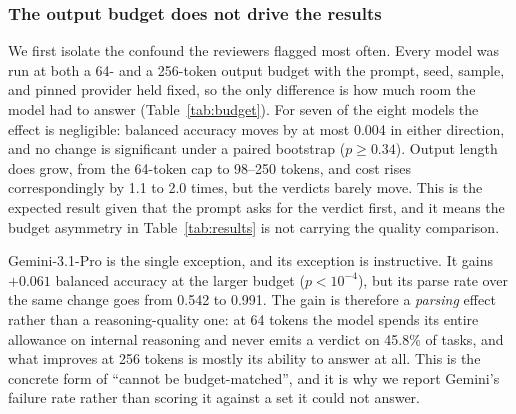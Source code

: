 \documentclass[computers,article,submit,moreauthors]{Definitions/mdpi}
\begin{document}
\subsubsection*{The output budget does not drive the results}
We first isolate the confound the reviewers flagged most often. Every model was run at both a 64- and a 256-token output budget with the prompt, seed, sample, and pinned provider held fixed, so the only difference is how much room the model had to answer (Table~\ref{tab:budget}). For seven of the eight models the effect is negligible: balanced accuracy moves by at most 0.004 in either direction, and no change is significant under a paired bootstrap ($p\geq0.34$). Output length does grow, from the 64-token cap to 98--250 tokens, and cost rises correspondingly by 1.1 to 2.0 times, but the verdicts barely move. This is the expected result given that the prompt asks for the verdict first, and it means the budget asymmetry in Table~\ref{tab:results} is not carrying the quality comparison.

Gemini-3.1-Pro is the single exception, and its exception is instructive. It gains $+0.061$ balanced accuracy at the larger budget ($p<10^{-4}$), but its parse rate over the same change goes from 0.542 to 0.991. The gain is therefore a \emph{parsing} effect rather than a reasoning-quality one: at 64 tokens the model spends its entire allowance on internal reasoning and never emits a verdict on 45.8\% of tasks, and what improves at 256 tokens is mostly its ability to answer at all. This is the concrete form of ``cannot be budget-matched'', and it is why we report Gemini's failure rate rather than scoring it against a set it could not answer.
\end{document}
